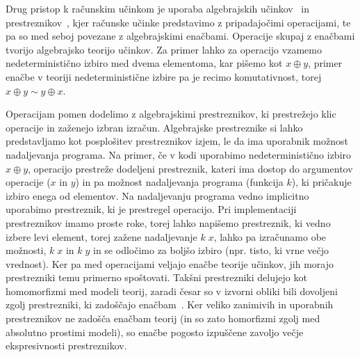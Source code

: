 \documentclass{article}
\begin{document}
Drug pristop k računskim učinkom je uporaba algebrajskih učinkov~\cite{DBLP:conf/fossacs/PlotkinP01, DBLP:journals/acs/PlotkinP03} in prestreznikov~\cite{DBLP:conf/esop/PlotkinP09}, kjer računske učinke predstavimo z pripadajočimi operacijami, te pa so med seboj povezane z algebrajskimi enačbami. Operacije skupaj z enačbami tvorijo algebrajsko teorijo učinkov. Za primer lahko za operacijo vzamemo nedeterministično izbiro med dvema elementoma, kar pišemo kot $x \oplus y$, primer enačbe v teoriji nedeterministične izbire pa je recimo komutativnost, torej $x \oplus y \sim y \oplus x$.

Operacijam pomen dodelimo z algebrajskimi prestreznikov, ki prestrežejo klic operacije in zaženejo izbran izračun. Algebrajske prestreznike si lahko predstavljamo kot posplošitev prestreznikov izjem, le da ima uporabnik možnost nadaljevanja programa. Na primer, če v kodi uporabimo nedeterministično izbiro $x \oplus y$, operacijo prestreže dodeljeni prestreznik, kateri ima dostop do argumentov operacije ($x$ in $y$) in pa možnost nadaljevanja programa (funkcija $k$), ki pričakuje izbiro enega od elementov. Na nadaljevanju programa vedno implicitno uporabimo prestreznik, ki je prestregel operacijo. Pri implementaciji prestreznikov imamo proste roke, torej lahko napišemo prestreznik, ki vedno izbere levi element, torej zažene nadaljevanje $k\; x$, lahko pa izračunamo obe možnosti, $k\; x$ in $k\; y$ in se odločimo za boljšo izbiro (npr. tisto, ki vrne večjo vrednost). Ker pa med operacijami veljajo enačbe teorije učinkov, jih morajo prestrezniki temu primerno spoštovati. Takšni prestrezniki delujejo kot homomorfizmi med modeli teorij, zaradi česar so v izvorni obliki bili dovoljeni zgolj prestrezniki, ki zadoščajo enačbam~\cite{DBLP:conf/esop/PlotkinP09}. Ker veliko zanimivih in uporabnih prestreznikov ne zadošča enačbam teorij (in so zato homorfizmi zgolj med absolutno prostimi modeli), so enačbe pogosto izpuščene zavoljo večje ekspresivnosti prestreznikov.
\end{document}
